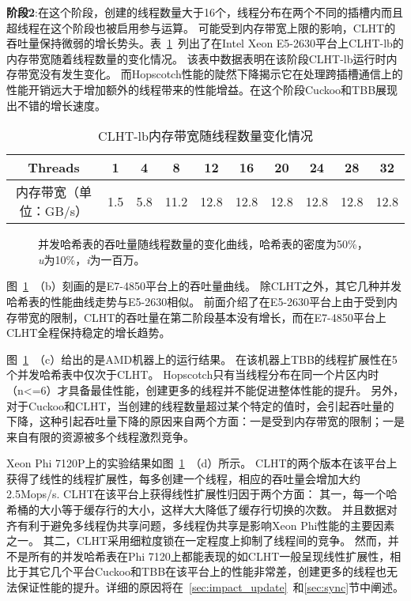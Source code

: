 \textbf{阶段2}:在这个阶段，创建的线程数量大于16个，线程分布在两个不同的插槽内而且超线程在这个阶段也被启用参与运算。
可能受到内存带宽上限的影响，CLHT的吞吐量保持微弱的增长势头。表~\ref{tab:mem_bandwidth}~列出了在Intel Xeon E5-2630平台上CLHT-lb的内存带宽随着线程数量的变化情况。
该表中数据表明在该阶段CLHT-lb运行时内存带宽没有发生变化。
而Hopscotch性能的陡然下降揭示它在处理跨插槽通信上的性能开销远大于增加额外的线程带来的性能增益。在这个阶段Cuckoo和TBB展现出不错的增长速度。

\begin{table}[htbp]
  \centering
  \caption{CLHT-lb内存带宽随线程数量变化情况}
  \label{tab:mem_bandwidth}
  \begin{tabular}{cccccccccc}
    \toprule
       Threads & 1 & 4 & 8 & 12 & 16 & 20 & 24 & 28 & 32 \\
    \midrule
      内存带宽（单位：GB/s） & 1.5 & 5.8 & 11.2 & 12.8 & 12.8 & 12.8 & 12.8 & 12.8 & 12.8 \\ 
    \bottomrule
  \end{tabular}
\end{table}


\begin{figure}[htbp]
\centering
\caption{并发哈希表的吞吐量随线程数量的变化曲线，哈希表的密度为50\%，\textit{u}为10\%，\textit{i}为一百万。}
\label{fig:thread_scal}
\end{figure}

图~\ref{fig:thread_scal}~（b）刻画的是E7-4850平台上的吞吐量曲线。
除CLHT之外，其它几种并发哈希表的性能曲线走势与E5-2630相似。
前面介绍了在E5-2630平台上由于受到内存带宽的限制，CLHT的吞吐量在第二阶段基本没有增长，而在E7-4850平台上CLHT全程保持稳定的增长趋势。

图~\ref{fig:thread_scal}~（c）给出的是AMD机器上的运行结果。
在该机器上TBB的线程扩展性在5个并发哈希表中仅次于CLHT。
Hopscotch只有当线程分布在同一个片区内时（n<=6）才具备最佳性能，创建更多的线程并不能促进整体性能的提升。
另外，对于Cuckoo和CLHT，当创建的线程数量超过某个特定的值时，会引起吞吐量的下降，这种引起吞吐量下降的原因来自两个方面：一是受到内存带宽的限制；一是来自有限的资源被多个线程激烈竞争。

Xeon Phi 7120P上的实验结果如图~\ref{fig:thread_scal}~（d）所示。
CLHT的两个版本在该平台上获得了线性的线程扩展性，每多创建一个线程，相应的吞吐量会增加大约2.5Mops/s. 
CLHT在该平台上获得线性扩展性归因于两个方面：
其一，每一个哈希桶的大小等于缓存行的大小，这样大大降低了缓存行切换的次数。
并且数据对齐有利于避免多线程伪共享问题，多线程伪共享是影响Xeon Phi性能的主要因素之一。
其二，CLHT采用细粒度锁在一定程度上抑制了线程间的竞争。
然而，并不是所有的并发哈希表在Phi 7120上都能表现的如CLHT一般呈现线性扩展性，相比于其它几个平台Cuckoo和TBB在该平台上的性能非常差，创建更多的线程也无法保证性能的提升。详细的原因将在~\ref{sec:impact_update}~和\ref{sec:sync}节中阐述。


